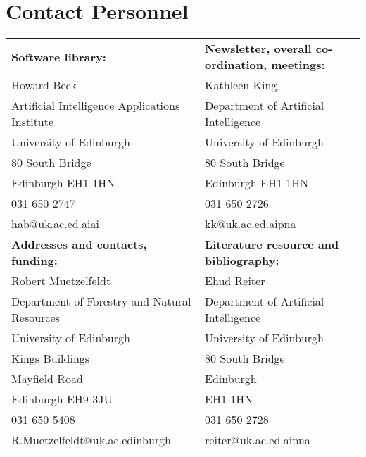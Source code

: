 \section{Contact Personnel}
\begin{tabular}{l|l}
{\bf Software library:} & {\bf Newsletter, overall co-ordination,
meetings:}\\ 
Howard Beck &  Kathleen King\\
Artificial Intelligence Applications Institute &  Department of
Artificial Intelligence \\
University of Edinburgh & University of Edinburgh\\
80 South Bridge & 80 South Bridge\\
Edinburgh EH1 1HN & Edinburgh EH1 1HN\\
031 650 2747 & 031 650 2726\\
hab@uk.ac.ed.aiai & kk@uk.ac.ed.aipna\\
\hline
{\bf Addresses and contacts, funding:} & {\bf Literature resource and bibliography:} \\ 
Robert Muetzelfeldt & Ehud Reiter\\
Department of Forestry and Natural Resources &   Department of Artificial Intelligence\\
University of Edinburgh & University of Edinburgh\\
Kings Buildings & 80 South Bridge\\
 Mayfield Road &  Edinburgh\\
Edinburgh   EH9 3JU & EH1 1HN\\
 031 650 5408 & 031 650 2728\\
 R.Muetzelfeldt@uk.ac.edinburgh & reiter@uk.ac.ed.aipna\\
\hline

\end{tabular}




